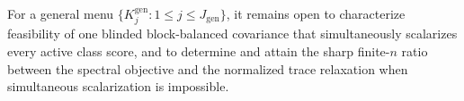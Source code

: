 For a general menu \(\{K_j^{\mathrm{gen}}:1\le j\le J_{\mathrm{gen}}\}\), it remains open to characterize feasibility of one blinded block-balanced covariance that simultaneously scalarizes every active class score, and to determine and attain the sharp finite-\(n\) ratio between the spectral objective and the normalized trace relaxation when simultaneous scalarization is impossible.